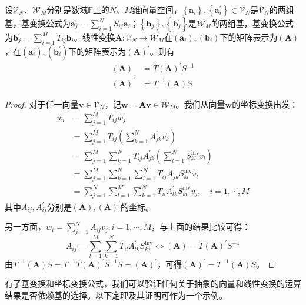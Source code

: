 \documentclass[main.tex]{subfiles}
\begin{document}
\begin{theorem}\label{thm:II.5.2}
设$\mathcal{V}_N$、$\mathcal{W}_M$分别是数域$\mathbb{F}$上的$N$、$M$维向量空间，$\left\{\mathbf{a}_i\right\},\left\{\mathbf{a}^\prime_i\right\}\in\mathcal{V}_N$是$\mathcal{V}_N$的两组基，基变换公式为$\mathbf{a}^\prime_j=\sum_{i=1}^NS_{ij}\mathbf{a}_i$；$\left\{\mathbf{b}_j\right\},\left\{\mathbf{b}^\prime_j\right\}$是$\mathcal{W}_M$的两组基，基变换公式为$\mathbf{b}^\prime_j=\sum_{i=1}^MT_{ij}\mathbf{b}_i$。线性变换$\mathbf{A}:\mathcal{V}_N\rightarrow\mathcal{W}_M$在$\left(\mathbf{a}_i\right),\left(\mathbf{b}_i\right)$下的矩阵表示为$\left(\mathbf{A}\right)$，在$\left(\mathbf{a}^\prime_i\right),\left(\mathbf{b}^\prime_i\right)$下的矩阵表示为$\left(\mathbf{A}\right)^\prime$。则有
\begin{align*}
    \left(\mathbf{A}\right)&=T\left(\mathbf{A}\right)^\prime S^{-1}\\
    \left(\mathbf{A}\right)^\prime&=T^{-1}\left(\mathbf{A}\right)S
\end{align*}
\end{theorem}
\begin{proof}
对于任一向量$\mathbf{v}\in\mathcal{V}_N$，记$\mathbf{w}=\mathbf{Av}\in\mathcal{W}_M$。我们从向量$\mathbf{w}$的坐标变换出发：
\begin{align*}
    w_i&=\sum_{j=1}^MT_{ij}w^\prime_j\\
    &=\sum_{j=1}^MT_{ij}\left(\sum_{k=1}^NA^\prime_{jk}v^\prime_k\right)\\
    &=\sum_{j=1}^M\sum_{k=1}^NT_{ij}A^\prime_{jk}\left(\sum_{l=1}^NS^\mathrm{inv}_{kl}v_l\right)\\
    &=\sum_{j=1}^M\sum_{k=1}^N\sum_{l=1}^NT_{ij}A^\prime_{jk}S^\mathrm{inv}_{kl}v_l\\
    &=\sum_{j=1}^N\sum_{l=1}^M\sum_{k=1}^NT_{il}A^\prime_{lk}S^\mathrm{inv}_{kl}v_j,\quad i=1,\cdots,M
\end{align*}
其中$A_{ij},A^\prime_{ij}$分别是$\left(\mathbf{A}\right),\left(\mathbf{A}\right)^\prime$的坐标。

另一方面，$w_i=\sum_{j=1}^NA_{ij}v_j,i=1,\cdots,M$，与上面的结果比较可得：
\[
A_{ij}=\sum_{l=1}^M\sum_{k=1}^NT_{il}A^\prime_{lk}S^\mathrm{inv}_{kj}
\Leftrightarrow \left(\mathbf{A}\right)=T\left(\mathbf{A}\right)^\prime S^{-1}
\]
由$T^{-1}\left(\mathbf{A}\right)S=T^{-1}T\left(\mathbf{A}\right)^\prime S^{-1}S=\left(\mathbf{A}\right)^\prime$，可得$\left(\mathbf{A}\right)^\prime=T^{-1}\left(\mathbf{A}\right)S$。
\end{proof}

有了基变换和坐标变换公式，我们可以验证任何关于抽象的向量和线性变换的运算结果是否依赖基的选择。以下定理及其证明可作为一个示例。
\end{document}
